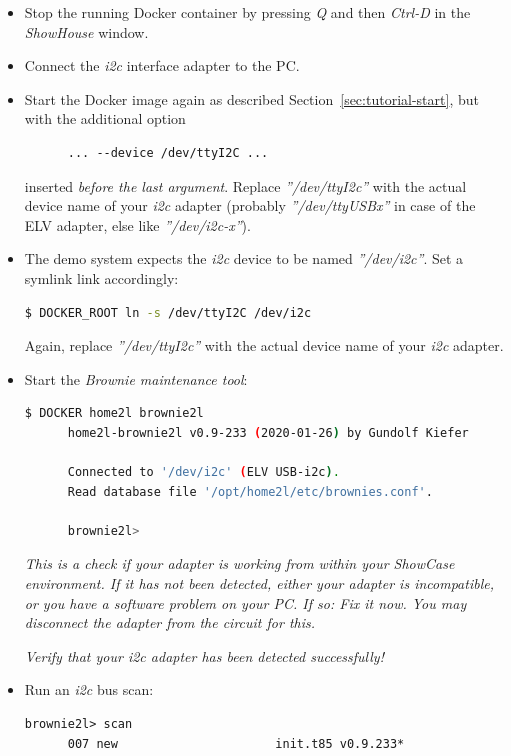 \documentclass[12pt,english,parskip=half,headheight=19pt]{scrreprt}
\begin{document}
\begin{itemize}[$\blacktriangleright$]
  \item
    Stop the running Docker container by pressing \textit{Q} and then \textit{Ctrl-D} in the \textit{ShowHouse} window.

  \item
    Connect the \textit{i2c} interface adapter to the PC.

  \item
    Start the Docker image again as described Section~\ref{sec:tutorial-start},
    but with the additional option
    \begin{lstlisting}
      ... --device /dev/ttyI2C ...
    \end{lstlisting}
    inserted \textit{before the last argument}. Replace \textit{''/dev/ttyI2c''} with the actual
    device name of your \textit{i2c} adapter (probably \textit{''/dev/ttyUSBx''} in case of the ELV
    adapter, else like \textit{''/dev/i2c-x''}).

  \item
    The demo system expects the \textit{i2c} device to be named \textit{''/dev/i2c''}.
    Set a symlink link accordingly:
    \begin{lstlisting}[language=bash]
      $ DOCKER_ROOT ln -s /dev/ttyI2C /dev/i2c
    \end{lstlisting}
    Again, replace \textit{''/dev/ttyI2c''} with the actual device name of your \textit{i2c} adapter.

  \item
    Start the \textit{Brownie maintenance tool}:
    \begin{lstlisting}[language=bash]
      $ DOCKER home2l brownie2l
      home2l-brownie2l v0.9-233 (2020-01-26) by Gundolf Kiefer

      Connected to '/dev/i2c' (ELV USB-i2c).
      Read database file '/opt/home2l/etc/brownies.conf'.

      brownie2l>
    \end{lstlisting}

    \textit{This is a check if your adapter is working from within your ShowCase environment.
    If it has not been detected, either your adapter is incompatible, or you have a software
    problem on your PC. If so: Fix it now. You may disconnect the adapter from the circuit for this.}

    \textit{Verify that your \textit{i2c} adapter has been detected successfully!}

  \item
    Run an \textit{i2c} bus scan:
    \begin{lstlisting}[language=brownie2l]
      brownie2l> scan
      007 new                      init.t85 v0.9.233*
    \end{lstlisting}


\end{itemize}
\end{document}
